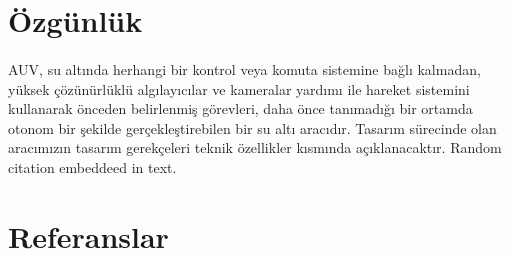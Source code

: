 \documentclass[12pt]{article}
\begin{document}
\section{Özgünlük}

\begin{justify}
\paragraph{} AUV, su altında herhangi bir kontrol veya komuta sistemine bağlı kalmadan, yüksek çözünürlüklü algılayıcılar ve kameralar yardımı ile hareket sistemini kullanarak önceden belirlenmiş görevleri, daha önce tanımadığı bir ortamda otonom bir şekilde gerçekleştirebilen bir su altı aracıdır. Tasarım sürecinde olan aracımızın tasarım gerekçeleri teknik özellikler kısmında açıklanacaktır. Random citation \cite{BOOK:o-ring} embeddeed in text.
\end{justify}

\section{Referanslar}

\printbibliography[title={}]
\end{document}
